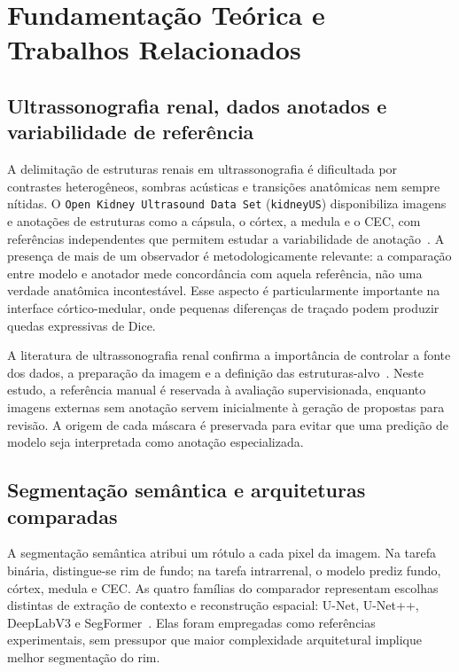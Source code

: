 \documentclass[12pt]{article}
\begin{document}
\section{Fundamentação Teórica e Trabalhos Relacionados}

\subsection{Ultrassonografia renal, dados anotados e variabilidade de referência}
A delimitação de estruturas renais em ultrassonografia é dificultada por contrastes heterogêneos, sombras acústicas e transições anatômicas nem sempre nítidas. O \texttt{Open Kidney Ultrasound Data Set} (\texttt{kidneyUS}) disponibiliza imagens e anotações de estruturas como a cápsula, o córtex, a medula e o CEC, com referências independentes que permitem estudar a variabilidade de anotação~\cite{Singla2023KidneyUS}. A presença de mais de um observador é metodologicamente relevante: a comparação entre modelo e anotador mede concordância com aquela referência, não uma verdade anatômica incontestável. Esse aspecto é particularmente importante na interface córtico-medular, onde pequenas diferenças de traçado podem produzir quedas expressivas de Dice.

A literatura de ultrassonografia renal confirma a importância de controlar a fonte dos dados, a preparação da imagem e a definição das estruturas-alvo~\cite{Khan2024KidneySeg,Zuo2025RenalAttention,Zhang2026RenalUSDLReview}. Neste estudo, a referência manual é reservada à avaliação supervisionada, enquanto imagens externas sem anotação servem inicialmente à geração de propostas para revisão. A origem de cada máscara é preservada para evitar que uma predição de modelo seja interpretada como anotação especializada.

\subsection{Segmentação semântica e arquiteturas comparadas}
A segmentação semântica atribui um rótulo a cada pixel da imagem. Na tarefa binária, distingue-se rim de fundo; na tarefa intrarrenal, o modelo prediz fundo, córtex, medula e CEC. As quatro famílias do comparador representam escolhas distintas de extração de contexto e reconstrução espacial: U-Net, U-Net++, DeepLabV3 e SegFormer~\cite{Ronneberger2015,Zhou2018UNetPP,Chen2017DeepLabV3,Xie2021SegFormer}. Elas foram empregadas como referências experimentais, sem pressupor que maior complexidade arquitetural implique melhor segmentação do rim.
\end{document}
